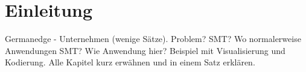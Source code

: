 \section{Einleitung}
\label{sec:Einleitung}

Germanedge - Unternehmen (wenige Sätze).
Problem?
SMT? Wo normalerweise Anwendungen SMT?
Wie Anwendung hier?
Beispiel mit Visualisierung und Kodierung.
Alle Kapitel kurz erwähnen und in einem Satz erklären.
